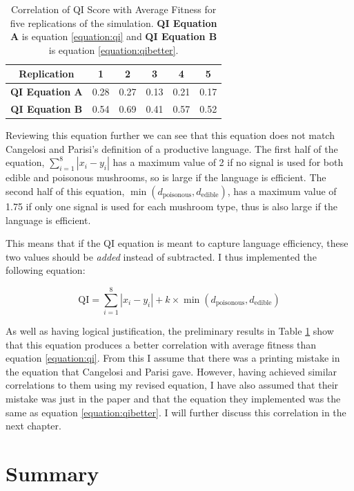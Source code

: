 \documentclass[12pt,a4paper,twoside,openright]{report}
\begin{document}
\begin{table}[t]
\centering
 \begin{tabular}{ c || c | c | c | c | c}
 \bf{Replication} & \bf{1} & \bf{2} & \bf{3} & \bf{4} & \bf{5}\\
 \hline
  \hline
\bf {QI Equation A} & 0.28 & 0.27 & 0.13 & 0.21 & 0.17 \\
 \hline
\bf {QI Equation B} & 0.54 & 0.69 & 0.41 & 0.57 & 0.52 \\
\end{tabular}
\caption{Correlation of QI Score with Average Fitness for five replications of the simulation. {\bf QI Equation A} is equation \ref{equation:qi} and {\bf QI Equation B} is equation \ref{equation:qibetter}.}
\label{table:qi-correlation}
\end{table}

Reviewing this equation further we can see that this equation does not match Cangelosi and Parisi's  definition of a productive language. The first half of the equation, $\sum^{8}_{i = 1} |x_i - y_i|$ has a maximum value of 2 if no signal is used for both edible and poisonous mushrooms, so is large if the language is efficient. The second half of this equation, $\min (d_{\mathrm{poisonous}}, d_{\mathrm{edible}})$, has a maximum value of 1.75 if only one signal is used for each mushroom type, thus is also large if the language is efficient. 

This means that if the QI equation is meant to capture language efficiency, these two values should be \emph{added} instead of subtracted. I thus implemented the following equation:

\begin{equation}
\label{equation:qibetter}
\mathrm{QI} = \sum^{8}_{i = 1} |x_i - y_i| + k \times \min (d_{\mathrm{poisonous}}, d_{\mathrm{edible}})
\end{equation}

As well as having logical justification, the preliminary results in Table \ref{table:qi-correlation} show that this equation produces a better correlation with average fitness than equation \ref{equation:qi}. From this I assume that there was a printing mistake in the equation that Cangelosi and Parisi gave. However, having achieved similar correlations to them using my revised equation, I have also assumed that their mistake was just in the paper and that the equation they implemented was the same as equation \ref{equation:qibetter}. I will further discuss this correlation in the next chapter.

\section{Summary}
\end{document}
